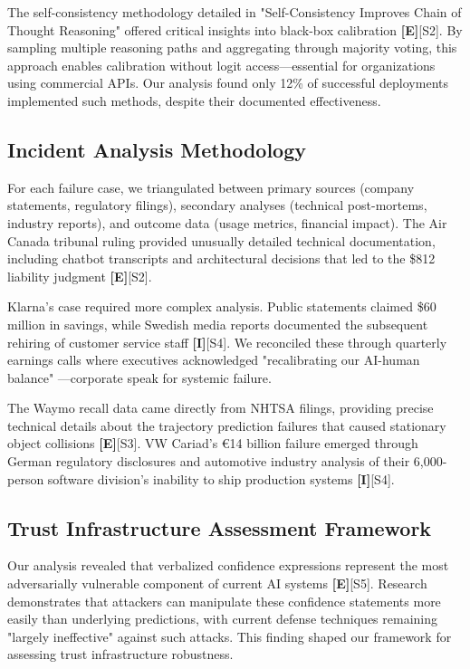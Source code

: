 \documentclass[a4paper,11pt]{article}
\newcommand{\elabel}{\textbf{\textcolor{ecolor}{[E]}}}
\newcommand{\ilabel}{\textbf{\textcolor{icolor}{[I]}}}
\begin{document}
The self-consistency methodology detailed in "Self-Consistency Improves Chain of Thought Reasoning" offered critical insights into black-box calibration \elabel{}\textcolor{primary}{[S2]}. By sampling multiple reasoning paths and aggregating through majority voting, this approach enables calibration without logit access—essential for organizations using commercial APIs. Our analysis found only 12\% of successful deployments implemented such methods, despite their documented effectiveness.


\subsection{Incident Analysis Methodology}

For each failure case, we triangulated between primary sources (company statements, regulatory filings), secondary analyses (technical post-mortems, industry reports), and outcome data (usage metrics, financial impact). The Air Canada tribunal ruling provided unusually detailed technical documentation, including chatbot transcripts and architectural decisions that led to the \$812 liability judgment \elabel{}\textcolor{primary}{[S2]}.


Klarna's case required more complex analysis. Public statements claimed \$60 million in savings, while Swedish media reports documented the subsequent rehiring of customer service staff \ilabel{}\textcolor{primary}{[S4]}. We reconciled these through quarterly earnings calls where executives acknowledged "recalibrating our AI-human balance" —corporate speak for systemic failure.


The Waymo recall data came directly from NHTSA filings, providing precise technical details about the trajectory prediction failures that caused stationary object collisions \elabel{}\textcolor{primary}{[S3]}. VW Cariad's €14 billion failure emerged through German regulatory disclosures and automotive industry analysis of their 6,000-person software division's inability to ship production systems \ilabel{}\textcolor{primary}{[S4]}.


\subsection{Trust Infrastructure Assessment Framework}

Our analysis revealed that verbalized confidence expressions represent the most adversarially vulnerable component of current AI systems \elabel{}\textcolor{primary}{[S5]}. Research demonstrates that attackers can manipulate these confidence statements more easily than underlying predictions, with current defense techniques remaining "largely ineffective" against such attacks. This finding shaped our framework for assessing trust infrastructure robustness.
\end{document}

